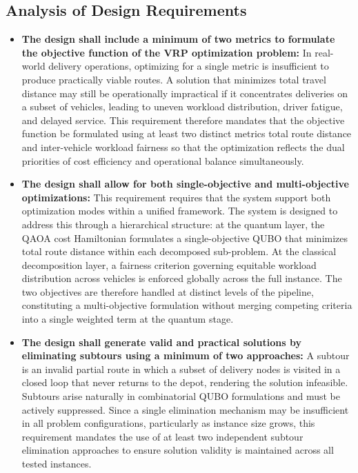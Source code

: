 \documentclass[a4paper]{report}
\begin{document}
{\begin{itemize}
\section{Analysis of Design Requirements}

 \begin{itemize}

  \item \textbf{The design shall include a minimum of two metrics to formulate
  the objective function of the VRP optimization problem:}
  In real-world delivery operations, optimizing for a single metric is
  insufficient to produce practically viable routes. A solution that minimizes
  total travel distance may still be operationally impractical if it
  concentrates deliveries on a subset of vehicles, leading to uneven workload
  distribution, driver fatigue, and delayed service. This requirement therefore
  mandates that the objective function be formulated using at least two distinct
  metrics total route distance and inter-vehicle workload fairness so
  that the optimization reflects the dual priorities of cost efficiency and
  operational balance simultaneously.

  \item \textbf{The design shall allow for both single-objective and
  multi-objective optimizations:}
  This requirement requires that the system support both optimization modes
  within a unified framework. The system is designed to address this through a
  hierarchical structure: at the quantum layer, the QAOA cost Hamiltonian
  formulates a single-objective QUBO that minimizes total route distance within
  each decomposed sub-problem. At the classical decomposition layer, a fairness
  criterion governing equitable workload distribution across vehicles is
  enforced globally across the full instance. The two objectives are therefore
  handled at distinct levels of the pipeline, constituting a multi-objective
  formulation without merging competing criteria into a single weighted term at
  the quantum stage.

  \item \textbf{The design shall generate valid and practical solutions by
  eliminating subtours using a minimum of two approaches:}
  A subtour is an invalid partial route in which a subset of delivery nodes is
  visited in a closed loop that never returns to the depot, rendering the
  solution infeasible. Subtours arise naturally in combinatorial QUBO
  formulations and must be actively suppressed. Since a single elimination
  mechanism may be insufficient in all problem configurations, particularly as
  instance size grows, this requirement mandates the use of at least two
  independent subtour elimination approaches to ensure solution validity is
  maintained across all tested instances.


\end{itemize}
\end{itemize}}
\end{document}
